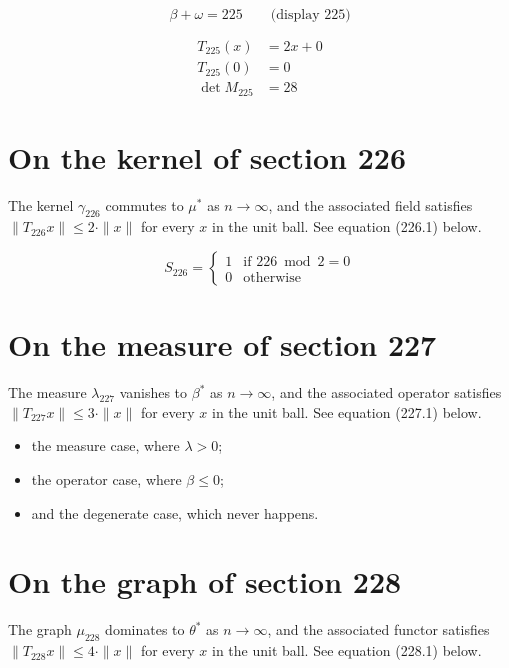 \documentclass{article}
\begin{document}
$$
\beta + \omega = 225 \qquad \text{(display 225)}
$$

\begin{align}
T_{225}(x) &= 2 x + 0 \\
T_{225}(0) &= 0 \\
\det M_{225} &= 28
\end{align}

\section{On the kernel of section 226}
The kernel $\gamma_{226}$ commutes to $\mu^{*}$ as $n \to \infty$,
and the associated field satisfies $\|T_{226} x\| \leq 2 \cdot \|x\|$
for every $x$ in the unit ball. See equation (226.1) below.

\begin{equation}
S_{226} = \begin{cases} 1 & \text{if } 226 \bmod 2 = 0 \\ 0 & \text{otherwise} \end{cases}
\end{equation}

\section{On the measure of section 227}
The measure $\lambda_{227}$ vanishes to $\beta^{*}$ as $n \to \infty$,
and the associated operator satisfies $\|T_{227} x\| \leq 3 \cdot \|x\|$
for every $x$ in the unit ball. See equation (227.1) below.

\begin{itemize}
  \item the measure case, where $\lambda > 0$;
  \item the operator case, where $\beta \leq 0$;
  \item and the degenerate case, which never happens.
\end{itemize}

\section{On the graph of section 228}
The graph $\mu_{228}$ dominates to $\theta^{*}$ as $n \to \infty$,
and the associated functor satisfies $\|T_{228} x\| \leq 4 \cdot \|x\|$
for every $x$ in the unit ball. See equation (228.1) below.
\end{document}
